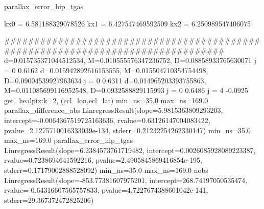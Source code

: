 \documentclass[14pt]{article} %
\begin{document}
parallax_error_hip_tgas

kx0 = 6.581188329078526
kx1 = 6.427547469592509
kx2 = 6.250989547406075

################################################################################
d=0.015735371044512534,	M=0.010555576347236752,	D=0.08858933765630071
j =	0	0.6162
d=0.015942892616153555,	M=0.015504710354754498,	D=0.09004539927963634
j =	0	0.6311
d=0.014965203393755863,	M=0.011085699116952548,	D=0.0932588829115993
j =	0	0.6486
j =	4	-0.0925
get_healpix:k=2, (ecl_lon,ecl_lat)
min_ns=35.0	max_ns=169.0	parallax_difference_abs LinregressResult(slope=5.9815363809293203, intercept=-0.0064367519725163636, rvalue=0.63126147004083422, pvalue=2.1275710016333039e-134, stderr=0.21232254262330147)
min_ns=35.0	max_ns=169.0	parallax_error_hip_tgas LinregressResult(slope=6.2384573761719482, intercept=0.0026085928089223387, rvalue=0.7238694641592216, pvalue=2.4905845869416854e-195, stderr=0.17179002888528092)
min_ns=35.0	max_ns=169.0	nobs LinregressResult(slope=-853.77381607975201, intercept=268.74197050535474, rvalue=-0.64316607565757833, pvalue=4.7227674388601042e-141, stderr=29.367372472825206)
\end{document}
